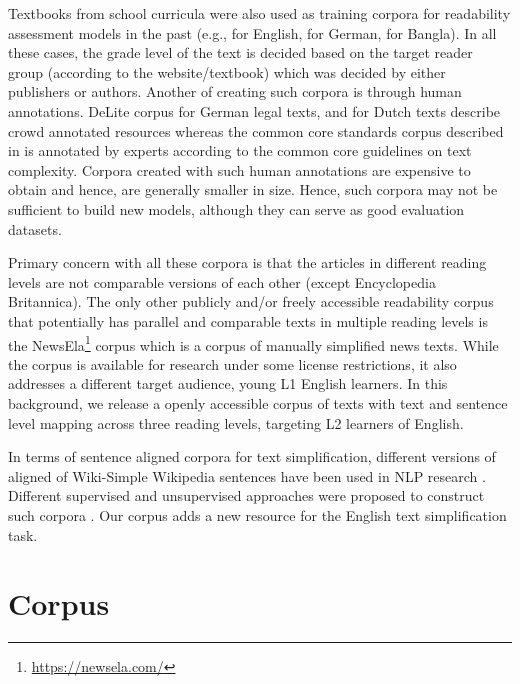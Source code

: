 \documentclass[11pt,a4paper]{article}
\begin{document}
Textbooks from school curricula were also used as training corpora for readability assessment models in the past (e.g., \citet{Heilman.Collins-Thompson.ea-08} for English, \citet{Berendes.ea-17} for German, \cite{Islam.Mehler.ea-12} for Bangla). In all these cases, the grade level of the text is decided based on the target reader group (according to the website/textbook) which was decided by either publishers or authors. Another of creating such corpora is through human annotations. DeLite corpus \citet{VorderBruck.Helbig.ea-08} for German legal texts, and \citet{Oosten.Hoste-11, Clercq.Hoste.ea-14} for Dutch texts describe crowd annotated resources whereas the common core standards corpus described in \citet{Nelson.Perfetti.ea-12} is annotated by experts according to the common core guidelines on text complexity. Corpora created with such human annotations are expensive to obtain and hence, are generally smaller in size. Hence, such corpora may not be sufficient to build new models, although they can serve as good evaluation datasets. 

Primary concern with all these corpora is that the articles in different reading levels are not comparable versions of each other (except Encyclopedia Britannica). The only other publicly and/or freely accessible readability corpus that potentially has parallel and comparable texts in multiple reading levels is the NewsEla\footnote{\url{https://newsela.com/}} corpus which is a corpus of manually simplified news texts. While the corpus is available for research under some license restrictions, it also addresses a different target audience, young L1 English learners. In this background, we release a openly accessible corpus of texts with text and sentence level mapping across three reading levels, targeting L2 learners of English. 

In terms of sentence aligned corpora for text simplification, different versions of aligned of Wiki-Simple Wikipedia sentences have been used in NLP research \cite{Zhu.Bernhard.ea-10,Coster.Kauchak-11,Hwang.Hajishirzi.ea-15}. Different supervised and unsupervised approaches were proposed to construct such corpora \cite{Bott.Saggion-11,Klerke.Soegaard-12,Klaper.Ebling.ea-13,Brunato.Cimino.ea-16}. Our corpus adds a new resource for the English text simplification task. 

\section{Corpus}
\label{sec:corpus}
\end{document}
